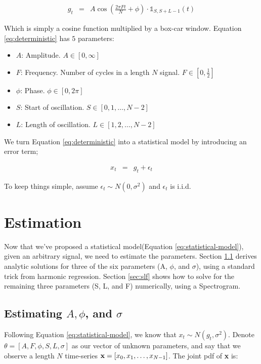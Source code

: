 \documentclass[11pt]{article}
\theoremstyle{plain}
\theoremstyle{definition}
\begin{document}
\begin{eqnarray}
	\label{eq:deterministic}
	g_t &=& A \cos(\frac{2 \pi F t}{N} + \phi) \cdot \mathbb{1}_{S, S + L - 1}(t)
\end{eqnarray}

\noindent Which is simply a cosine function multiplied by a box-car window. Equation \ref{eq:deterministic} has $5$ parameters:

\begin{itemize}
\setlength\itemsep{.1em}
	\item $A$: Amplitude. $A \in [0, \infty]$
	\item $F$: Frequency. Number of cycles in a length $N$ signal. $F \in [0, \frac{1}{2}]$
	\item $\phi$: Phase. $\phi \in [0, 2 \pi]$
	\item $S$: Start of oscillation. $S \in [0, 1, \ldots, N - 2]$
	\item $L$: Length of oscillation. $L \in [1, 2, \ldots, N - 2]$
\end{itemize}

\noindent We turn Equation \ref{eq:deterministic} into a statistical model by introducing an error term;

\begin{eqnarray}
\label{eq:statistical-model}
x_t &=& g_t + \epsilon_t 
\end{eqnarray}

\noindent To keep things simple, assume $\epsilon_t \sim N(0, \sigma^2)$ and $\epsilon_t$ is i.i.d.

\section{Estimation}
\label{sec:estimation}
Now that we've proposed a statistical model(Equation \ref{eq:statistical-model}), given an arbitrary signal, we need to estimate the parameters. Section \ref{sec:aphisigma} derives analytic solutions for three of the six parameters (A, $\phi$, and $\sigma$), using a standard trick from harmonic regression. Section \ref{sec:slf} shows how to solve for the remaining three parameters (S, L, and F) numerically, using a Spectrogram. 

\subsection{Estimating $A, \phi$, and $\sigma$}
\label{sec:aphisigma}

Following Equation \ref{eq:statistical-model}, we know that $x_t \sim N(g_t, \sigma^2)$. Denote $\theta = [A, F, \phi, S, L, \sigma]$ as our vector of unknown parameters, and say that we observe a length $N$ time-series ${\bf x} = [x_0, x_1, \ldots, x_{N - 1}]$. The joint pdf of {\bf x} is:
\end{document}
